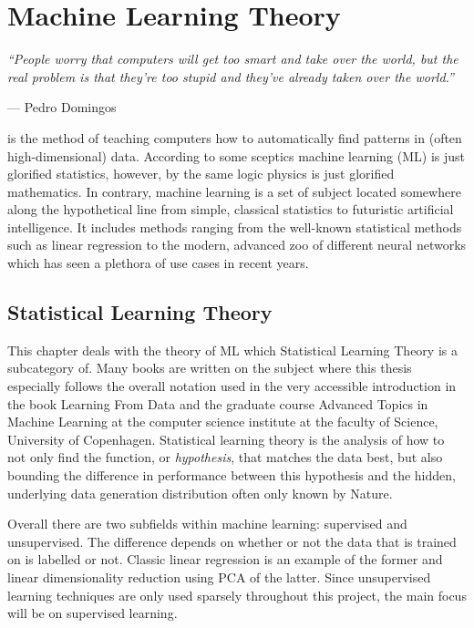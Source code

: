 
\chapter{Machine Learning Theory}
\label{ch:ML_theory}

\epigraph{\textit{``People worry that computers will get too smart and take over the world, but the real problem is that they're too stupid and they've already taken over the world.''}}{--- Pedro Domingos}

 is the method of teaching computers how to automatically find patterns in (often high-dimensional) data. According to some sceptics machine learning (ML) is just glorified statistics, however, by the same logic physics is just glorified mathematics. In contrary, machine learning is a set of subject located somewhere along the hypothetical line from simple, classical statistics to futuristic artificial intelligence. It includes methods ranging from the well-known statistical methods such as linear regression to the modern, advanced zoo of different neural networks \citep{veenNeuralNetworkZoo2016} which has seen a plethora of use cases in recent years. 

\section{Statistical Learning Theory}
This chapter deals with the theory of ML which Statistical Learning Theory is a subcategory of. Many books are written on the subject where this thesis especially follows the overall notation used in the very accessible introduction in the book Learning From Data \citep{abu-mostafaLearningData2012} and the graduate course Advanced Topics in Machine Learning \citep{AdvancedTopicsMachine} at the computer science institute at the faculty of Science, University of Copenhagen. Statistical learning theory is the analysis of how to not only find the function, or \emph{hypothesis}, that matches the data best, but also bounding the difference in performance between this hypothesis and the hidden, underlying data generation distribution often only known by Nature. 

Overall there are two subfields within machine learning: supervised and unsupervised. The difference depends on whether or not the data that is trained on is labelled or not. Classic linear regression is an example of the former and linear dimensionality reduction using PCA of the latter. Since unsupervised learning techniques are only used sparsely throughout this project, the main focus will be on supervised learning. 

